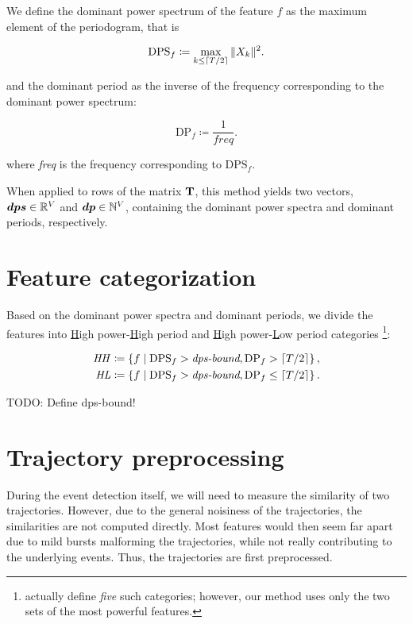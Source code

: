 We define the dominant power spectrum of the feature $f$ as the maximum element of the periodogram, that is

\begin{equation}
	\text{DPS}_{f} \coloneqq \max_{k \leq \lceil T / 2\rceil}{\|X_{k}\|^{2}}.
\end{equation}

and the dominant period as the inverse of the frequency corresponding to the dominant power spectrum:

\begin{equation}
	\text{DP}_{f} \coloneqq \frac{1}{\mathit{freq}}.
\end{equation}

where \textit{freq} is the frequency corresponding to $\text{DPS}_{f}$.

When applied to rows of the matrix $\mathbf{T}$, this method yields two vectors, $\vect{DPS} \in \R^{\featcount}$ and $\vect{DP} \in \N^{\featcount}$, containing the dominant power spectra and dominant periods, respectively.


\section{Feature categorization}
Based on the dominant power spectra and dominant periods, we divide the features into \underline{H}igh power-\underline{H}igh period and \underline{H}igh power-\underline{L}ow period categories \footnote{\cite{event-detection} actually define \textit{five} such categories; however, our method uses only the two sets of the most powerful features.}:

\begin{equation}
\begin{split}
	\mathit{HH} \coloneqq \left\{ f \mid \text{DPS}_{f} > \textit{dps-bound}, \text{DP}_{f} > \lceil T / 2\rceil \right\}, \\
	\mathit{HL} \coloneqq \left\{ f \mid \text{DPS}_{f} > \textit{dps-bound}, \text{DP}_{f} \leq \lceil T / 2\rceil \right\}.
\end{split}
\end{equation}

{\color{red}TODO: Define dps-bound!}


\section{Trajectory preprocessing}
During the event detection itself, we will need to measure the similarity of two trajectories. However, due to the general noisiness of the trajectories, the similarities are not computed directly. Most features would then seem far apart due to mild bursts malforming the trajectories, while not really contributing to the underlying events. Thus, the trajectories are first preprocessed.

